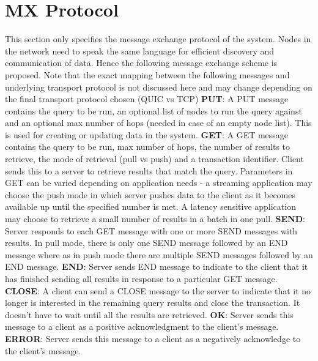 \documentclass[preprint,12pt]{elsarticle}
\begin{document}
\section{MX Protocol}
This section only specifies the message exchange protocol of the system. Nodes in the network need to speak the same language for efficient discovery and communication of data. Hence the following message exchange scheme is proposed. Note that the exact mapping between the following messages and underlying transport protocol is not discussed here and may change depending on the final transport protocol chosen (QUIC vs TCP)
\newline
\newline
\textbf{PUT}:  A PUT message contains the query to be run, an optional list of nodes to run the query against and an optional max number of hops (needed in case of an empty node list). This is used for creating or updating data in the system.
\newline
\newline
\textbf{GET}: A GET message contains the query to be run, max number of hops, the number of results to retrieve, the mode of retrieval (pull vs push) and a transaction identifier. Client sends this to a server to retrieve results that match the query. Parameters in GET can be varied depending on application needs - a streaming application may choose the push mode in which server pushes data to the client as it becomes available up until the specified number is met. A latency sensitive application may choose to retrieve a small number of results in a batch in one pull.
\newline
\newline
\textbf{SEND}: Server responds to each GET message with one or more SEND messages with results. In pull mode, there is only one SEND message followed by an END message where as in push mode there are multiple SEND messages followed by an END message.
\newline
\newline
\textbf{END}: Server sends END message to indicate to the client that it has finished sending all results in response to a particular GET message.
\newline
\newline
\textbf{CLOSE}: A client can send a CLOSE message to the server to indicate that it no longer is interested in the remaining query results and close the transaction. It doesn't have to wait until all the results are retrieved.
\newline
\newline
\textbf{OK}: Server sends this message to a client as a positive acknowledgment to the client's message.
\newline
\newline
\textbf{ERROR}: Server sends this message to a client as a negatively acknowledge to the client's message.
\end{document}
